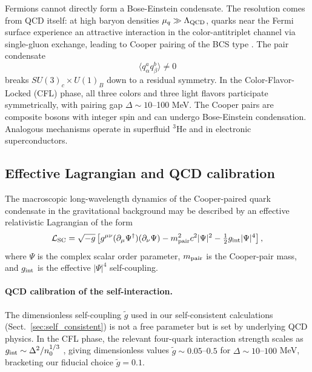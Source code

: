 \documentclass[epj]{svjour}
\begin{document}
Fermions cannot directly form a Bose-Einstein condensate. The resolution comes from QCD itself: at high baryon densities $\mu_q \gg \Lambda_{\rm QCD}$, quarks near the Fermi surface experience an attractive interaction in the color-antitriplet channel via single-gluon exchange, leading to Cooper pairing of the BCS type \cite{Alford2008}. The pair condensate
\begin{equation}
\langle q^a_\alpha q^b_\beta \rangle \neq 0
\end{equation}
breaks $SU(3)_c \times U(1)_B$ down to a residual symmetry. In the Color-Flavor-Locked (CFL) phase, all three colors and three light flavors participate symmetrically, with pairing gap $\Delta \sim 10$--100 MeV. The Cooper pairs are composite bosons with integer spin and can undergo Bose-Einstein condensation. Analogous mechanisms operate in superfluid $^3$He and in electronic superconductors.

\subsection{Effective Lagrangian and QCD calibration}
\label{sec:lagrangian}

The macroscopic long-wavelength dynamics of the Cooper-paired quark condensate in the gravitational background may be described by an effective relativistic Lagrangian of the form
\begin{equation}
\mathcal{L}_{\rm SC} = \sqrt{-g}\left[
g^{\mu\nu}(\partial_\mu \Psi^\dagger)(\partial_\nu \Psi) 
- m_{\rm pair}^2 c^2 |\Psi|^2 
- \tfrac{1}{2} g_{\rm int} |\Psi|^4
\right],
\label{eq:Lagrangian}
\end{equation}
where $\Psi$ is the complex scalar order parameter, $m_{\rm pair}$ is the Cooper-pair mass, and $g_{\rm int}$ is the effective $|\Psi|^4$ self-coupling.

\paragraph{QCD calibration of the self-interaction.}
The dimensionless self-coupling $\tilde{g}$ used in our self-consistent calculations (Sect.~\ref{sec:self_consistent}) is not a free parameter but is set by underlying QCD physics. In the CFL phase, the relevant four-quark interaction strength scales as $g_{\rm int} \sim \Delta^2 / n_0^{1/3}$ \cite{Alford2008}, giving dimensionless values $\tilde{g} \sim 0.05$--$0.5$ for $\Delta \sim 10$--$100$ MeV, bracketing our fiducial choice $\tilde{g} = 0.1$.
\end{document}
